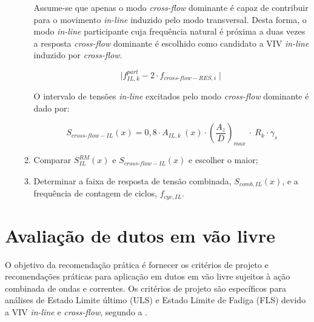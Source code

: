 \begin{itemize}
\begin{enumerate}
        Assume-se que apenas o modo \textit{cross-flow} dominante é capaz de contribuir para o movimento \textit{in-line} induzido pelo modo transversal.
        Desta forma, o modo \textit{in-line} participante cuja frequência natural é próxima a duas vezes a resposta \textit{cross-flow} dominante é escolhido como candidato a VIV \textit{in-line} induzido por \textit{cross-flow}.
        
        \[\mid f_{\mathit{IL}, \mathit{k}}^\mathit{part} - 2 \cdot f_{\mathit{\textit{cross-flow}-RES}, \mathit{i}} \mid\]
        
        O intervalo de tensões \textit{in-line} excitados pelo modo \textit{cross-flow} dominante é dado por:
        
       		\[S_{\mathit{\textit{cross-flow}}-\mathit{IL}}(x) = 0,8 \cdot A_{\mathit{IL}, \mathit{k}}~(x) \cdot \left(\frac{A_{z}}{D}\right)_\mathit{max}~\cdot~R_k \cdot \gamma_s\]
    
    \item Comparar $S_\mathit{IL}^\mathit{RM}(x)$ e $S_{\mathit{\textit{cross-flow}}-\mathit{IL}}(x)$ e escolher o maior;
    
    \item Determinar a faixa de resposta de tensão combinada, $S_{\mathit{comb}, \mathit{IL}}(x)$, e a frequência de contagem de ciclos, $f_{\mathit{cyc}, \mathit{IL}}$.
    \end{enumerate}
\end{itemize}



\section{Avaliação de dutos em vão livre}

O objetivo da recomendação prática  é fornecer os critérios de projeto e recomendações práticas para aplicação em dutos em vão livre sujeitos à ação combinada de ondas e correntes.
Os critérios de projeto são específicos para análises de Estado Limite último (ULS) e Estado Limite de Fadiga (FLS) devido a VIV \textit{in-line} e \textit{cross-flow}, segundo a .

